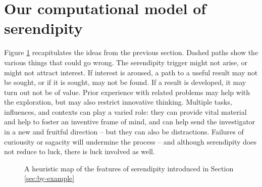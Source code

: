 \section{Our computational model of serendipity} \label{sec:our-model}

Figure \ref{model-diagram} recapitulates the ideas from the previous
section.  Dashed paths show the various things that could go wrong.
The serendipity trigger might not arise, or might not attract
interest.  If interest is aroused, a path to a useful result may not
be sought, or if it is sought, may not be found.  If a result is
developed, it may turn out not be of value.  Prior experience with
related problems may help with the exploration, but may also restrict
innovative thinking.  Multiple tasks, influences, and contexts can
play a varied role: they can provide vital material and help to foster
an inventive frame of mind, and can help send the investigator in a
new and fruitful direction -- but they can also be distractions.
Failures of curiousity or sagacity will undermine the process -- and
although serendipity does not reduce to luck, there is luck
involved as well.

\begin{figure}[h!]
{\centering
{}}
\vspace{-.5cm}
\caption{A heuristic map of the features of serendipity introduced in Section \ref{sec:by-example}}
\label{model-diagram}
\end{figure}

